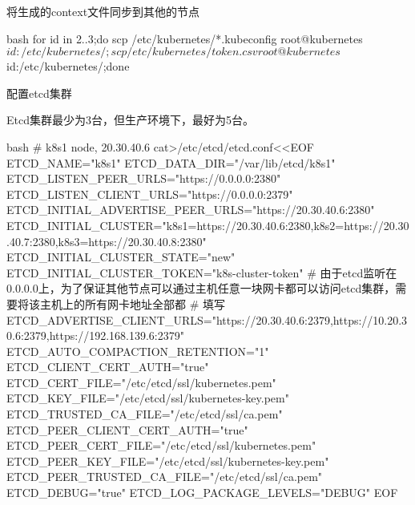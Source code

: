\begin{outline}[enumerate]
将生成的context文件同步到其他的节点
\begin{code-in-enumerate}{bash}
for id in {2..3};do scp /etc/kubernetes/*.kubeconfig root@kubernetes$id:/etc/kubernetes/; scp /etc/kubernetes/token.csv root@kubernetes$id:/etc/kubernetes/;done
\end{code-in-enumerate}

  \1 配置etcd集群

Etcd集群最少为3台，但生产环境下，最好为5台。
\begin{code-in-enumerate}{bash}
# k8s1 node, 20.30.40.6
cat>/etc/etcd/etcd.conf<<EOF
ETCD_NAME="k8s1"
ETCD_DATA_DIR="/var/lib/etcd/k8s1"
ETCD_LISTEN_PEER_URLS="https://0.0.0.0:2380"
ETCD_LISTEN_CLIENT_URLS="https://0.0.0.0:2379"
ETCD_INITIAL_ADVERTISE_PEER_URLS="https://20.30.40.6:2380"
ETCD_INITIAL_CLUSTER="k8s1=https://20.30.40.6:2380,k8s2=https://20.30.40.7:2380,k8s3=https://20.30.40.8:2380"
ETCD_INITIAL_CLUSTER_STATE="new"
ETCD_INITIAL_CLUSTER_TOKEN="k8s-cluster-token"
# 由于etcd监听在0.0.0.0上，为了保证其他节点可以通过主机任意一块网卡都可以访问etcd集群，需要将该主机上的所有网卡地址全部都
# 填写
ETCD_ADVERTISE_CLIENT_URLS="https://20.30.40.6:2379,https://10.20.30.6:2379,https://192.168.139.6:2379"
ETCD_AUTO_COMPACTION_RETENTION="1"
ETCD_CLIENT_CERT_AUTH="true"
ETCD_CERT_FILE="/etc/etcd/ssl/kubernetes.pem"
ETCD_KEY_FILE="/etc/etcd/ssl/kubernetes-key.pem"
ETCD_TRUSTED_CA_FILE="/etc/etcd/ssl/ca.pem"
ETCD_PEER_CLIENT_CERT_AUTH="true"
ETCD_PEER_CERT_FILE="/etc/etcd/ssl/kubernetes.pem"
ETCD_PEER_KEY_FILE="/etc/etcd/ssl/kubernetes-key.pem"
ETCD_PEER_TRUSTED_CA_FILE="/etc/etcd/ssl/ca.pem"
ETCD_DEBUG="true"
ETCD_LOG_PACKAGE_LEVELS="DEBUG"
EOF


\end{code-in-enumerate}
\end{outline}
